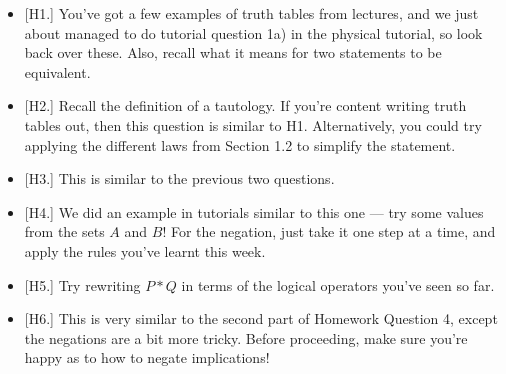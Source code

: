 \documentclass[
  10pt,
  a4paper]{article}
\providecommand{\tightlist}{%
  \setlength{\itemsep}{0pt}\setlength{\parskip}{0pt}}
\theoremstyle{plain}
\theoremstyle{definition}
\theoremstyle{plain}
\theoremstyle{plain}
\theoremstyle{plain}
\theoremstyle{plain}
\theoremstyle{definition}
\theoremstyle{definition}
\newtheorem*{Order Axioms*}{Order Axioms}\newtheorem{Order Axioms}{Order Axioms}[section]
\theoremstyle{remark}
\theoremstyle{remark}
\begin{document}
\begin{itemize}
\tightlist
\item
  {[}H1.{]} You've got a few examples of truth tables from lectures, and we just about managed to do tutorial question 1a) in the physical tutorial, so look back over these. Also, recall what it means for two statements to be equivalent.
\item
  {[}H2.{]} Recall the definition of a tautology. If you're content writing truth tables out, then this question is similar to H1. Alternatively, you could try applying the different laws from Section 1.2 to simplify the statement.
\item
  {[}H3.{]} This is similar to the previous two questions.
\item
  {[}H4.{]} We did an example in tutorials similar to this one --- try some values from the sets \(A\) and \(B\)! For the negation, just take it one step at a time, and apply the rules you've learnt this week.
\item
  {[}H5.{]} Try rewriting \(P*Q\) in terms of the logical operators you've seen so far.
\item
  {[}H6.{]} This is very similar to the second part of Homework Question 4, except the negations are a bit more tricky. Before proceeding, make sure you're happy as to how to negate implications!
\end{itemize}
\end{document}
